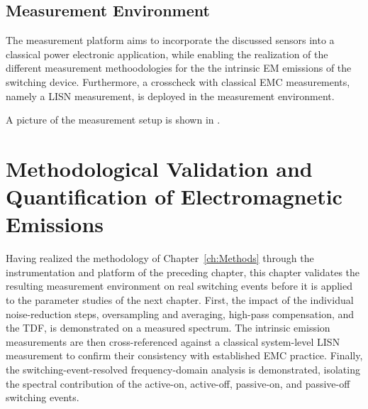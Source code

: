 

\section{Measurement Environment}
The measurement platform aims to incorporate the discussed sensors into a classical power electronic application, while enabling the realization of the different measurement methoodologies for the the intrinsic EM emissions of the switching device.
Furthermore, a crosscheck with classical EMC measurements, namely a LISN measurement, is deployed in the measurement environment.

A picture of the measurement setup is shown in .




\chapter{Methodological Validation and Quantification of Electromagnetic Emissions}

Having realized the methodology of Chapter~\ref{ch:Methods} through the instrumentation and platform of the preceding chapter, this chapter validates the resulting measurement environment on real switching events before it is applied to the parameter studies of the next chapter.
First, the impact of the individual noise-reduction steps, oversampling and averaging, high-pass compensation, and the TDF, is demonstrated on a measured spectrum.
The intrinsic emission measurements are then cross-referenced against a classical system-level LISN measurement to confirm their consistency with established EMC practice.
Finally, the switching-event-resolved frequency-domain analysis is demonstrated, isolating the spectral contribution of the active-on, active-off, passive-on, and passive-off switching events.






